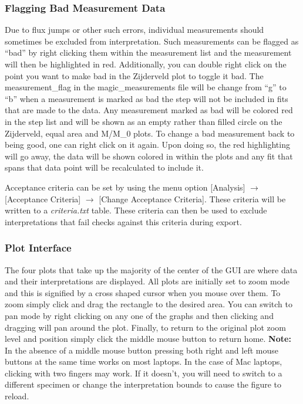 \documentclass[11pt]{book}
\begin{document}
{{\subsubsection{Flagging Bad Measurement Data}\label{flagging-bad-measurement-data}

Due to flux jumps or other such errors, individual measurements should sometimes be excluded from interpretation. Such measurements can be flagged as ``bad'' by right clicking them within the measurement list and the measurement will then be highlighted in red. Additionally, you can double right click on the point you want to make bad in the Zijderveld plot to toggle it bad. The measurement\_flag in the magic\_measurements file will be change from ``g'' to ``b'' when a measurement is marked as bad the step will not be included in fits that are made to the data. Any measurement marked as bad will be colored red in the step list and will be shown as an empty rather than filled circle on the Zijderveld, equal area and M/M\_0 plots. To change a bad measurement back to being good, one can right click on it again. Upon doing so, the red highlighting will go away, the data will be shown colored in within the plots and any fit that spans that data point will be recalculated to include it.

\noindent Acceptance criteria can be set by using the menu option [Analysis] $\rightarrow$ [Acceptance
Criteria] $\rightarrow$ [Change Acceptance Criteria]. These criteria will be written to a {\it criteria.txt}  table. These criteria can then be used to exclude interpretations that fail checks against this criteria during export.

\subsubsection{Plot Interface}\label{plot-interface}

The four plots that take up the majority of the center of the GUI are where data and their interpretations are displayed. All plots are initially set to zoom mode and this is signified by a cross shaped cursor when you mouse over them. To zoom simply click and drag the rectangle to the desired area. You can switch to pan mode by right clicking on any one of the graphs and then clicking and dragging will pan around the plot. Finally, to return to the original plot zoom level and position simply click the middle mouse button to return home. \textbf{Note:} In the absence of a middle mouse button pressing both right and left mouse buttons at the same time works on most laptops.  In the case of Mac laptops, clicking with two fingers may work.  If it doesn't, you will need to switch to a different specimen or change the interpretation bounds to cause the figure to reload.

}}
\end{document}
